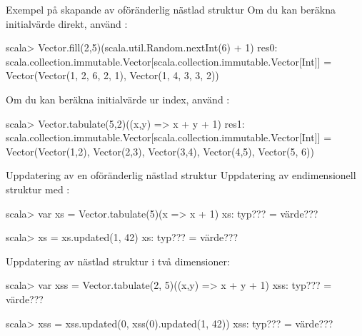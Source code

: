 \begin{Slide}{Exempel på skapande av oföränderlig nästlad struktur}\SlideFontSmall
Om du kan beräkna initialvärde direkt, använd :\\
{\SlideFontTiny{}}
\begin{REPL}
scala> Vector.fill(2,5)(scala.util.Random.nextInt(6) + 1)
res0:
  scala.collection.immutable.Vector[scala.collection.immutable.Vector[Int]] =
  Vector(Vector(1, 2, 6, 2, 1), Vector(1, 4, 3, 3, 2))

\end{REPL}
Om du kan beräkna initialvärde ur index, använd :\\
{\SlideFontTiny{}}
\begin{REPL}
scala> Vector.tabulate(5,2)((x,y) => x + y + 1)
res1:
  scala.collection.immutable.Vector[scala.collection.immutable.Vector[Int]] =
  Vector(Vector(1,2), Vector(2,3), Vector(3,4), Vector(4,5), Vector(5,	6))

\end{REPL}
\end{Slide}



\begin{Slide}{Uppdatering av en oföränderlig nästlad struktur}\SlideFontSmall
Uppdatering av endimensionell struktur med :\\
{\SlideFontTiny{} }
\begin{REPL}
scala> var xs = Vector.tabulate(5)(x => x + 1)
xs: typ??? = värde???

scala> xs = xs.updated(1, 42)
xs: typ??? = värde???
\end{REPL}

Uppdatering av nästlad struktur i två dimensioner:
\begin{REPL}
scala> var xss = Vector.tabulate(2, 5)((x,y) => x + y + 1)
xss:
  typ??? =
  värde???

scala> xss = xss.updated(0, xss(0).updated(1, 42))
xss:
  typ??? =
  värde???
\end{REPL}

\end{Slide}



